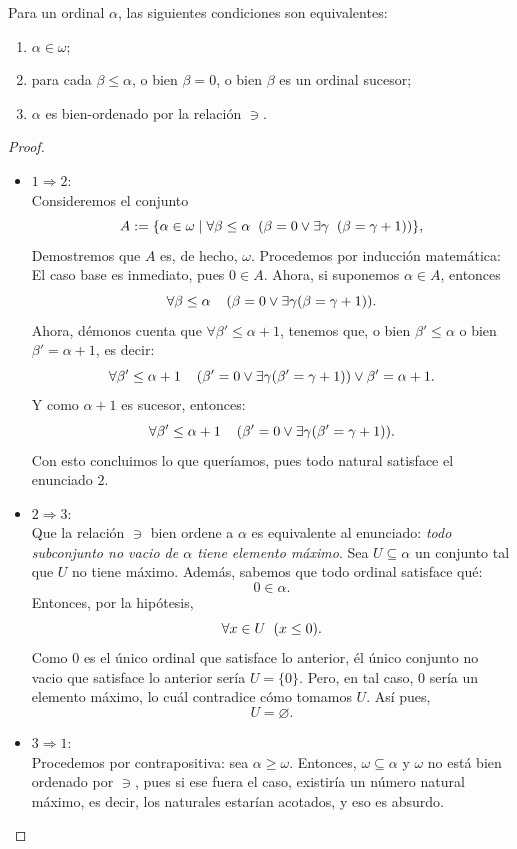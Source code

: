\begin{thm}
    Para un ordinal $\alpha$, las siguientes condiciones son equivalentes:
    \begin{enumerate}  
        \item $\alpha\in\omega$;
        \item para cada $\beta\leq\alpha$, o bien $\beta=0$, o bien $\beta$ es un ordinal sucesor;
        \item $\alpha$ es bien-ordenado por la relación $\ni$.
    \end{enumerate}
\end{thm}
\begin{proof} \hspace{0.5cm}
    \begin{itemize}
  \item $1\Longrightarrow2$: \\
    Consideremos el conjunto 
    \[A:=\{\alpha\in\omega\mid \forall\beta\leq\alpha\hspace{0.2cm}(\beta=0\lor\exists\gamma\hspace{0.2cm}(\beta=\gamma+1))\},\]
    Demostremos que $A$ es, de hecho, $\omega$. Procedemos por inducción matemática:
    El caso base es inmediato, pues $0\in A$. Ahora, si suponemos $\alpha\in A$, entonces 
    \[\forall \beta\leq \alpha\hspace{0.4cm}(\beta=0\lor\exists\gamma(\beta=\gamma+1)).\]
    Ahora, démonos cuenta que $\forall\beta'\leq \alpha+1$, tenemos que, o bien $\beta'\leq\alpha$ o bien $\beta'=\alpha+1$, es decir:
    \[\forall \beta'\leq \alpha+1\hspace{0.4cm}(\beta'=0\lor\exists\gamma(\beta'=\gamma+1))\lor \beta'=\alpha+1.\]
    Y como $\alpha+1$ es sucesor, entonces:
    \[\forall \beta'\leq \alpha+1\hspace{0.4cm}(\beta'=0\lor\exists\gamma(\beta'=\gamma+1)).\]
    Con esto concluimos lo que queríamos, pues todo natural satisface el enunciado $2$.
  \item $2\Longrightarrow3$:\\
    Que la relación $\ni$ bien ordene a $\alpha$ es equivalente al enunciado:
    \textit{todo subconjunto no vacio de $\alpha$ tiene elemento máximo}. 
    Sea $U\subseteq\alpha$ un conjunto tal que $U$ no tiene máximo. Además, sabemos que todo ordinal satisface qué:
    \[0\in\alpha.\]
    Entonces, por la hipótesis,
    \[\forall x\in U\hspace{0.2cm}(x\leq 0).\]
    Como $0$ es el único ordinal que satisface lo anterior, él único conjunto no vacio que satisface lo anterior sería $U=\{0\}$. Pero, en tal caso, $0$ sería un elemento máximo, lo cuál contradice cómo tomamos $U$. Así pues,
    \[U=\varnothing.\]
  \item $3\Longrightarrow1$:\\
    Procedemos por contrapositiva: sea $\alpha\geq \omega$. Entonces, $\omega\subseteq\alpha$ y $\omega$ no está bien ordenado por $\ni$, pues si ese fuera el caso, existiría un número natural máximo, es decir, los naturales estarían acotados, y eso es absurdo.
\end{itemize}
\end{proof}

